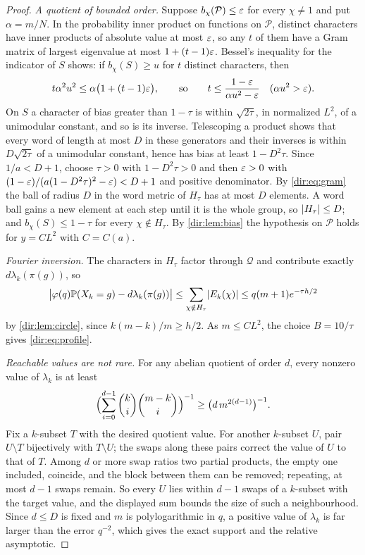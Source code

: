 \begin{proof}
\emph{A quotient of bounded order.} Suppose $b_\chi(\mathcal P)\le\varepsilon$ for every
$\chi\ne1$ and put $\alpha=m/N$. In the probability inner product on functions on
$\mathcal P$, distinct characters have inner products of absolute value at most $\varepsilon$, so any
$t$ of them have a Gram matrix of largest eigenvalue at most $1+(t-1)\varepsilon$. Bessel's inequality
for the indicator of $S$ shows: if $b_\chi(S)\ge u$ for $t$ distinct characters, then
\begin{equation}\label{dir:eq:gram}
 t\alpha^2u^2\le\alpha\bigl(1+(t-1)\varepsilon\bigr),\qquad\text{so}\qquad
 t\le\frac{1-\varepsilon}{\alpha u^2-\varepsilon}\quad(\alpha u^2>\varepsilon).
\end{equation}
On $S$ a character of bias greater than $1-\tau$ is within $\sqrt{2\tau}$, in normalized $L^2$,
of a unimodular constant, and so is its inverse. Telescoping a product shows that every word
of length at most $D$ in these generators and their inverses is within $D\sqrt{2\tau}$ of a
unimodular constant, hence has bias at least $1-D^2\tau$. Since $1/a<D+1$, choose $\tau>0$
with $1-D^2\tau>0$ and then $\varepsilon>0$ with
$(1-\varepsilon)/(a(1-D^2\tau)^2-\varepsilon)<D+1$ and positive denominator. By \eqref{dir:eq:gram} the
ball of radius $D$ in the word metric of $H_\tau$ has at most $D$ elements. A word ball
gains a new element at each step until it is the whole group, so $\lvert H_\tau\rvert\le D$; and
$b_\chi(S)\le1-\tau$ for every $\chi\notin H_\tau$. By \cref{dir:lem:bias} the hypothesis on
$\mathcal P$ holds for $y=CL^2$ with $C=C(a)$.

\emph{Fourier inversion.} The characters in $H_\tau$ factor through $\mathcal Q$ and contribute
exactly $d\lambda_k(\pi(g))$, so
\[
 \bigl|\varphi(q)\mathbb{P}(X_k=g)-d\lambda_k(\pi(g))\bigr|\le\sum_{\chi\notin H_\tau}\lvert E_k(\chi)\rvert
 \le q(m+1)e^{-\tau h/2}
\]
by \cref{dir:lem:circle}, since $k(m-k)/m\ge h/2$. As $m\le CL^2$, the choice $B=10/\tau$
gives \eqref{dir:eq:profile}.

\emph{Reachable values are not rare.} For any abelian quotient of order $d$, every nonzero
value of $\lambda_k$ is at least
\[
 \Bigl(\sum_{i=0}^{d-1}\binom ki\binom{m-k}i\Bigr)^{-1}\ge\bigl(d\,m^{2(d-1)}\bigr)^{-1}.
\]
Fix a $k$-subset $T$ with the desired quotient value. For another $k$-subset $U$, pair
$U\setminus T$ bijectively with $T\setminus U$; the swaps along these pairs correct the value of
$U$ to that of $T$. Among $d$ or more swap ratios two partial products, the empty one included,
coincide, and the block between them can be removed; repeating, at most $d-1$ swaps remain.
So every $U$ lies within $d-1$ swaps of a $k$-subset with the target value, and the displayed
sum bounds the size of such a neighbourhood. Since $d\le D$ is fixed and $m$ is
polylogarithmic in $q$, a positive value of $\lambda_k$ is far larger than the error $q^{-2}$,
which gives the exact support and the relative asymptotic.
\end{proof}

